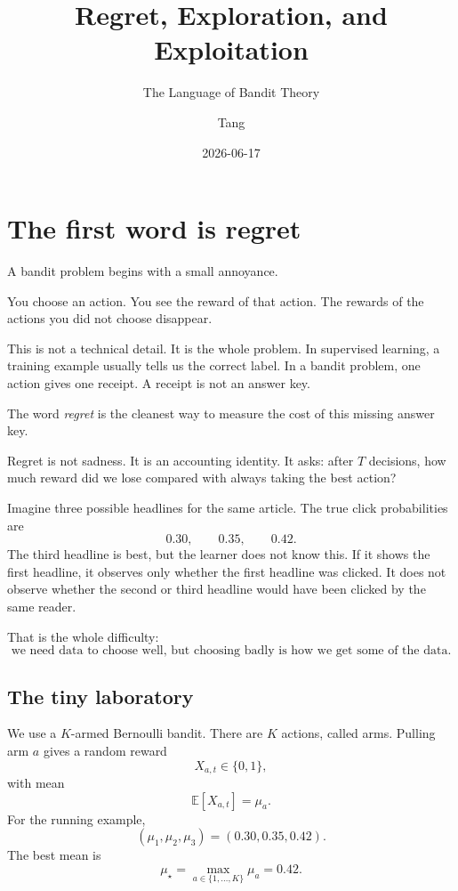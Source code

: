 \documentclass[en,nofont,11pt]{elegantbook}
\title{Regret, Exploration, and Exploitation}
\subtitle{The Language of Bandit Theory}
\author{Tang}
\institute{Tang's Machine Learning Blog}
\date{2026-06-17}
\newcommand{\E}{\mathbb{E}}
\begin{document}
\maketitle
\frontmatter
\tableofcontents
\mainmatter

\chapter{The first word is regret}

A bandit problem begins with a small annoyance.

You choose an action.  You see the reward of that action.  The rewards of the actions you did not choose disappear.

This is not a technical detail.  It is the whole problem.  In supervised learning, a training example usually tells us the correct label.  In a bandit problem, one action gives one receipt.  A receipt is not an answer key.

The word \emph{regret} is the cleanest way to measure the cost of this missing answer key.

\begin{idea}
Regret is not sadness.  It is an accounting identity.  It asks: after $T$ decisions, how much reward did we lose compared with always taking the best action?
\end{idea}

Imagine three possible headlines for the same article.  The true click probabilities are
\[
0.30,\qquad 0.35,\qquad 0.42.
\]
The third headline is best, but the learner does not know this.  If it shows the first headline, it observes only whether the first headline was clicked.  It does not observe whether the second or third headline would have been clicked by the same reader.

That is the whole difficulty:
\[
\text{we need data to choose well, but choosing badly is how we get some of the data.}
\]

\section{The tiny laboratory}

We use a $K$-armed Bernoulli bandit.  There are $K$ actions, called arms.  Pulling arm $a$ gives a random reward
\[
X_{a,t}\in\{0,1\},
\]
with mean
\[
\E[X_{a,t}] = \mu_a.
\]
For the running example,
\[
(\mu_1,\mu_2,\mu_3)=(0.30,0.35,0.42).
\]
The best mean is
\[
\mu_\star = \max_{a\in\{1,\ldots,K\}}\mu_a=0.42.
\]
\end{document}
